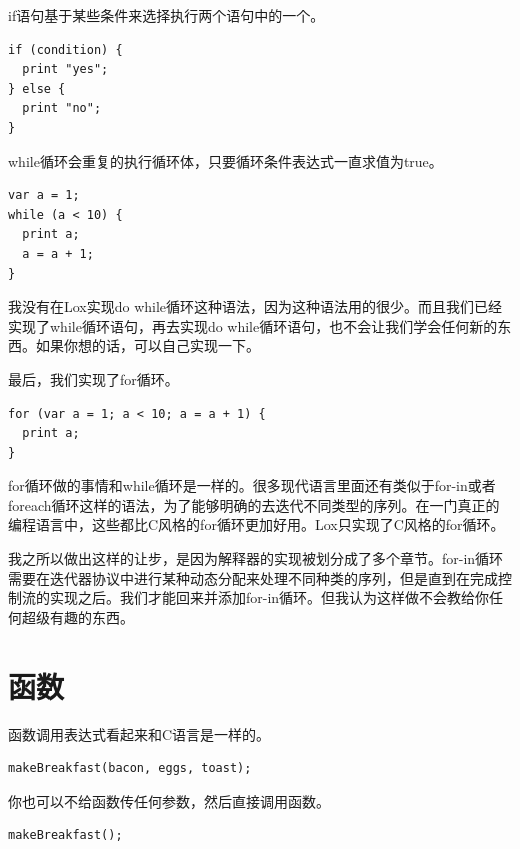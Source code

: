 \documentclass[cn,10pt,math=newtx,citestyle=gb7714-2015,bibstyle=gb7714-2015]{elegantbook}
\begin{document}
if语句基于某些条件来选择执行两个语句中的一个。

\begin{verbatim}
if (condition) {
  print "yes";
} else {
  print "no";
}
\end{verbatim}

while循环会重复的执行循环体，只要循环条件表达式一直求值为true。

\begin{verbatim}
var a = 1;
while (a < 10) {
  print a;
  a = a + 1;
}
\end{verbatim}

\begin{tcolorbox}
我没有在Lox实现do while循环这种语法，因为这种语法用的很少。而且我们已经实现了while循环语句，再去实现do while循环语句，也不会让我们学会任何新的东西。如果你想的话，可以自己实现一下。
\end{tcolorbox}

最后，我们实现了for循环。

\begin{verbatim}
for (var a = 1; a < 10; a = a + 1) {
  print a;
}
\end{verbatim}

for循环做的事情和while循环是一样的。很多现代语言里面还有类似于for-in或者foreach循环这样的语法，为了能够明确的去迭代不同类型的序列。在一门真正的编程语言中，这些都比C风格的for循环更加好用。Lox只实现了C风格的for循环。

\begin{tcolorbox}
我之所以做出这样的让步，是因为解释器的实现被划分成了多个章节。for-in循环需要在迭代器协议中进行某种动态分配来处理不同种类的序列，但是直到在完成控制流的实现之后。我们才能回来并添加for-in循环。但我认为这样做不会教给你任何超级有趣的东西。
\end{tcolorbox}

\section{函数}

函数调用表达式看起来和C语言是一样的。

\begin{verbatim}
makeBreakfast(bacon, eggs, toast);
\end{verbatim}

你也可以不给函数传任何参数，然后直接调用函数。

\begin{verbatim}
makeBreakfast();
\end{verbatim}
\end{document}
